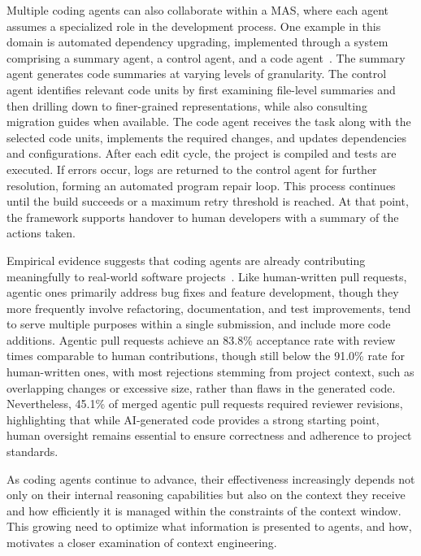 \documentclass[
english,                 %
bibtex,                  %
]{kththesis}
\numberwithin{listing}{chapter}
\begin{document}
Multiple coding agents can also collaborate within a \gls{MAS}, where each agent assumes a specialized role in the development process. One example in this domain is automated dependency upgrading, implemented through a system comprising a summary agent, a control agent, and a code agent~\cite{tawosi_llm_2025}. The summary agent generates code summaries at varying levels of granularity. The control agent identifies relevant code units by first examining file-level summaries and then drilling down to finer-grained representations, while also consulting migration guides when available. The code agent receives the task along with the selected code units, implements the required changes, and updates dependencies and configurations. After each edit cycle, the project is compiled and tests are executed. If errors occur, logs are returned to the control agent for further resolution, forming an automated program repair loop. This process continues until the build succeeds or a maximum retry threshold is reached. At that point, the framework supports handover to human developers with a summary of the actions taken.

Empirical evidence suggests that coding agents are already contributing meaningfully to real-world software projects~\cite{watanabe_use_2026}. Like human-written pull requests, agentic ones primarily address bug fixes and feature development, though they more frequently involve refactoring, documentation, and test improvements, tend to serve multiple purposes within a single submission, and include more code additions. Agentic pull requests achieve an 83.8\% acceptance rate with review times comparable to human contributions, though still below the 91.0\% rate for human-written ones, with most rejections stemming from project context, such as overlapping changes or excessive size, rather than flaws in the generated code. Nevertheless, 45.1\% of merged agentic pull requests required reviewer revisions, highlighting that while \gls{AI}-generated code provides a strong starting point, human oversight remains essential to ensure correctness and adherence to project standards.

As coding agents continue to advance, their effectiveness increasingly depends not only on their internal reasoning capabilities but also on the context they receive and how efficiently it is managed within the constraints of the context window. This growing need to optimize what information is presented to agents, and how, motivates a closer examination of context engineering.
\end{document}
